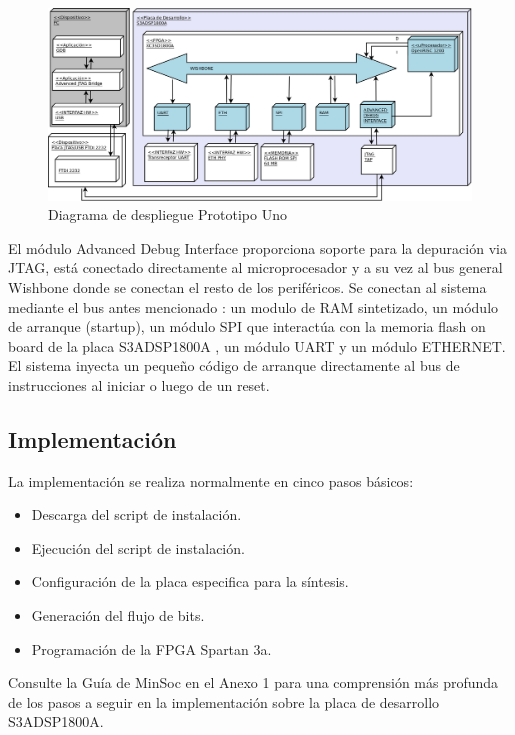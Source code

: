 		\begin{figure}[!h]
 		\begin{center}
  		\includegraphics[width=1\textwidth,keepaspectratio=true]{./images/proto1}
  		\caption{Diagrama de despliegue Prototipo Uno }
  		\label{fig:minsoc}
 		\end{center}
		\end{figure}
		
		El módulo Advanced Debug Interface proporciona soporte para la depuración via JTAG, está conectado directamente al microprocesador y a su vez al bus
		general Wishbone donde se conectan el resto de los periféricos. Se conectan al sistema mediante el bus antes mencionado : un modulo	de RAM
		sintetizado, un módulo de arranque (startup), un módulo SPI que interactúa con la memoria flash on board de la placa S3ADSP1800A , un módulo UART y
		un módulo ETHERNET. El sistema inyecta un pequeño código de arranque directamente al bus de instrucciones al iniciar o luego de un reset. 
			
		\subsection{Implementación}

La implementación se realiza normalmente en cinco pasos básicos: 
\begin {itemize}
\item Descarga del script de instalación.
\item Ejecución del script de instalación.
\item Configuración de la placa especifica para la síntesis.
\item Generación del flujo de bits.
\item Programación de la FPGA Spartan 3a.
 \end {itemize}
 Consulte la Guía de MinSoc en el Anexo 1 para una comprensión más profunda de los pasos a seguir en la implementación sobre la placa de desarrollo
 S3ADSP1800A.


